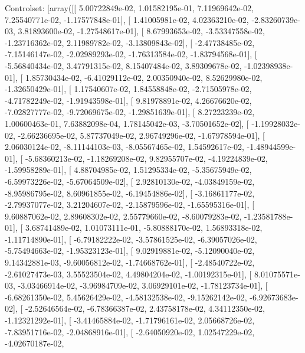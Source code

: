 \documentclass{article}
\begin{document}
Controlset: [array([[  5.00722849e-02,   1.01582195e-01,   7.11969642e-02,
          7.25540771e-02,  -1.17577848e-01],
       [  1.41005981e-02,   4.02363210e-02,  -2.83260739e-03,
          3.81893600e-02,  -1.27548617e-01],
       [  8.67993653e-02,  -3.53347558e-02,  -1.23716362e-02,
          2.11989782e-02,  -3.13809843e-02],
       [ -2.47738485e-02,  -7.15146147e-02,  -2.02989293e-02,
         -1.76313584e-02,  -1.83794568e-01],
       [ -5.56840434e-02,   3.47791315e-02,   8.15407484e-02,
          3.89309678e-02,  -1.02398938e-01],
       [  1.85730434e-02,  -6.41029112e-02,   2.00350940e-02,
          8.52629980e-02,  -1.32650429e-01],
       [  1.17540607e-02,   1.84558848e-02,  -2.71505978e-02,
         -4.71782249e-02,  -1.91943598e-01],
       [  9.81978891e-02,   4.26676620e-02,  -7.02827777e-02,
         -9.72069675e-02,  -1.29851639e-01],
       [  8.27223239e-02,   1.00600463e-01,   7.63882098e-04,
          1.78145042e-03,  -3.70501652e-02],
       [ -1.19928032e-02,  -2.66236695e-02,   5.87737049e-02,
          2.96749296e-02,  -1.67978594e-01],
       [  2.06030124e-02,  -8.11144103e-03,  -8.05567465e-02,
          1.54592617e-02,  -1.48944599e-01],
       [ -5.68360213e-02,  -1.18269208e-02,   9.82955707e-02,
         -4.19224839e-02,  -1.59958289e-01],
       [  4.88704985e-02,   1.51295334e-02,  -5.35675949e-02,
         -6.59973226e-02,  -5.67064509e-02],
       [  2.92810130e-02,  -4.03849159e-02,  -8.95986795e-02,
          8.60961855e-02,  -6.19454886e-02],
       [ -3.16861177e-02,  -2.79937077e-02,   3.21204607e-02,
         -2.15879596e-02,  -1.65595316e-01],
       [  9.60887062e-02,   2.89608302e-02,   2.55779660e-02,
         -8.60079283e-02,  -1.23581788e-01],
       [  3.68741489e-02,   1.01073111e-01,  -5.80888170e-02,
          1.56893318e-02,  -1.11714890e-01],
       [ -6.79182222e-02,  -3.57861525e-02,  -6.39057026e-02,
         -5.75494663e-02,  -1.95323123e-01],
       [  9.02919881e-02,  -5.12090040e-02,   9.14342881e-03,
         -9.60056812e-02,  -1.74668762e-01],
       [ -2.48540722e-02,  -2.61027473e-03,   3.55523504e-02,
          4.49804204e-02,  -1.00192315e-01],
       [  8.01075571e-03,  -3.03466914e-02,  -3.96984709e-02,
          3.06929101e-02,  -1.78123734e-01],
       [ -6.68261350e-02,   5.45626429e-02,  -4.58132538e-02,
         -9.15262142e-02,  -6.92673683e-02],
       [ -2.52646564e-02,  -6.78366387e-02,   2.43758178e-02,
          4.34112350e-02,  -1.12321292e-01],
       [ -3.41465884e-02,  -1.71796161e-02,   2.05668726e-02,
         -7.83951716e-02,  -2.04868916e-01],
       [ -2.64050920e-02,   1.02547229e-02,  -4.02670187e-02,
\end{document}
